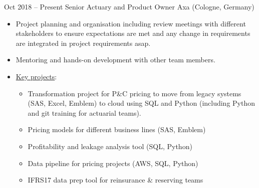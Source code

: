 \documentclass[a4paper,]{fortysecondscv}
\begin{document}
	\begin{cvtable}%

        \vspace{\topsep}
		\cvitem
			{Oct 2018 -- Present}
			{Senior Actuary and Product Owner}
			{Axa (Cologne, Germany)}
			{
				\vspace{-\topsep}
				\begin{itemize}[nosep, leftmargin=0pt] %
					\item Project planning and organisation including review meetings with different stakeholders to ensure expectations are met and any change in requirements are integrated in project requirements asap.
					\item Mentoring and hands-on development with other team members.
                    \item \underline{Key projects}:
					\begin{itemize}
                        \item Transformation project for P\&C pricing to move from legacy systems (SAS, Excel, Emblem) to cloud using SQL and Python (including Python and git training for actuarial teams).
                        \item Pricing models for different business lines (SAS, Emblem)
                        \item Profitability and leakage analysis tool (SQL, Python)
                        \item Data pipeline for pricing projects (AWS, SQL, Python)
                        \item IFRS17 data prep tool for reinsurance \& reserving teams
                    \end{itemize}
				\end{itemize}
			}
        \vspace{\topsep}

\end{cvtable}
\end{document}
